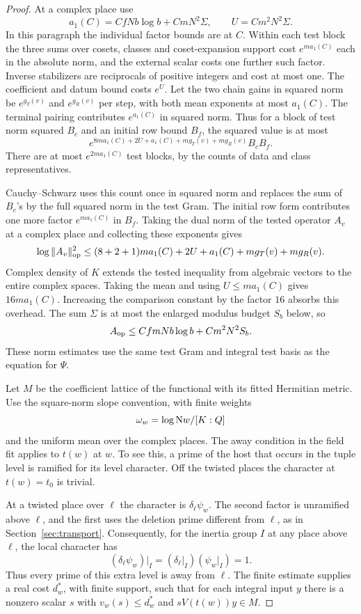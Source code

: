 \begin{proof}
At a complex place use
\[
 a_1(C)=CfNb\log b+CmN^2\Sigma,\qquad U=Cm^2N^2\Sigma.
\]
In this paragraph the individual factor bounds are at \(C\).
Within each test block the three sums over cosets, classes
and coset-expansion support cost \(e^{ma_1(C)}\) each in
the absolute norm, and the external scalar costs one
further such factor. Inverse stabilizers are reciprocals
of positive integers and cost at most one. The coefficient
and datum bound costs \(e^U\). Let the two chain gains in
squared norm be \(e^{g_T(v)}\) and \(e^{g_R(v)}\) per step,
with both mean exponents at most \(a_1(C)\). The terminal
pairing contributes \(e^{a_1(C)}\) in squared norm. Thus for
a block of test norm squared \(B_c\) and an initial row
bound \(B_f\), the squared value is at most
\[
 e^{8ma_1(C)+2U+a_1(C)+m g_T(v)+m g_R(v)}B_cB_f.
\]
There are at most \(e^{2ma_1(C)}\) test blocks, by the
counts of data and class representatives.

Cauchy--Schwarz
uses this count once in squared norm and replaces the sum
of \(B_c\)'s by the full squared norm in the test Gram.
The initial row form contributes one more factor
\(e^{ma_1(C)}\) in \(B_f\). Taking the dual norm of the tested operator \(A_v\) at a complex place and collecting these exponents gives
\[
  \log\|A_v\|_{\rm op}^2\le (8+2+1)m a_1(C)+2U+a_1(C)+m g_T(v)+m g_R(v).
\]
Complex density of \(K\) extends the tested inequality
from algebraic vectors to the entire complex spaces.
Taking the mean and using \(U\le ma_1(C)\) gives
\(16m a_1(C)\). Increasing the comparison constant by
the factor \(16\) absorbs this overhead. The sum \(\Sigma\)
is at most the enlarged modulus budget \(S_b\) below, so
\[
 A_{\rm op}\le Cf mNb\log b+Cm^2N^2S_b.
\]
These norm estimates use the same test Gram and integral
test basis as the equation for \(\Psi\).
\label{cor:fitted-row-height-1}

Let \(M\) be the coefficient lattice of the functional with its
fitted Hermitian metric. Use the square-norm slope convention, with
finite weights 
\[
  \omega_w=\log\mathrm Nw/[K:Q]
\]
 and the uniform
mean over the complex places. The away condition in the field
fit applies to \(t(w)\) at \(w\). To see this, a prime of the
host that occurs in the tuple level is ramified for its
level character. Off the twisted places the character at
\(t(w)=t_0\) is trivial.

At a twisted place over \(\ell\)
the character is \(\delta_\ell\psi_w\). The second factor
is unramified above \(\ell\), and the first uses the deletion
prime different from \(\ell\), as in
Section~\ref{sec:transport}.
Consequently, for the inertia group \(I\) at any place above \(\ell\), the local character has
\[
  (\delta_\ell\psi_w)|_I=(\delta_\ell|_I)(\psi_w|_I)=1.
\]
 Thus every prime of this
extra level is away from \(\ell\). The finite estimate supplies
a real cost \(d_w^*\), with finite support, such that for each
integral input \(y\) there is a nonzero scalar \(s\) with
\(v_w(s)\le d_w^*\) and \(s V(t(w))y\in M\).


\end{proof}
